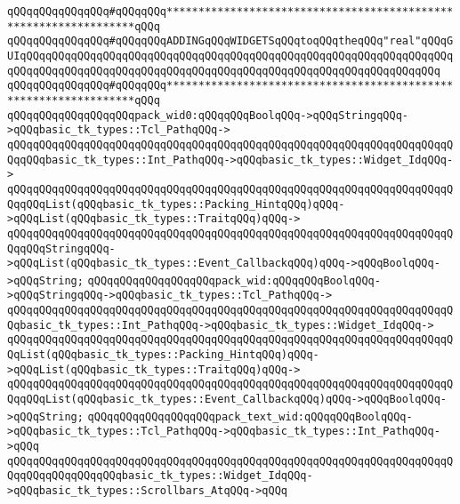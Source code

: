 \newline
\verb|qQQqqQQqqQQqqQQq#qQQqqQQq*****************************************************************qQQq|\newline
\verb|qQQqqQQqqQQqqQQq#qQQqqQQqADDINGqQQqWIDGETSqQQqtoqQQqtheqQQq"real"qQQqGUIqQQqqQQqqQQqqQQqqQQqqQQqqQQqqQQqqQQqqQQqqQQqqQQqqQQqqQQqqQQqqQQqqQQqqQQqqQQqqQQqqQQqqQQqqQQqqQQqqQQqqQQqqQQqqQQqqQQqqQQqqQQqqQQqqQQqqQQq|\newline
\verb|qQQqqQQqqQQqqQQq#qQQqqQQq*****************************************************************qQQq|\newline
\newline
\verb|qQQqqQQqqQQqqQQqqQQqpack_wid0:qQQqqQQqBoolqQQq->qQQqStringqQQq->qQQqbasic_tk_types::Tcl_PathqQQq->|\newline
\verb|qQQqqQQqqQQqqQQqqQQqqQQqqQQqqQQqqQQqqQQqqQQqqQQqqQQqqQQqqQQqqQQqqQQqqQQqqQQqbasic_tk_types::Int_PathqQQq->qQQqbasic_tk_types::Widget_IdqQQq->|\newline
\verb|qQQqqQQqqQQqqQQqqQQqqQQqqQQqqQQqqQQqqQQqqQQqqQQqqQQqqQQqqQQqqQQqqQQqqQQqqQQqList(qQQqbasic_tk_types::Packing_HintqQQq)qQQq->qQQqList(qQQqbasic_tk_types::TraitqQQq)qQQq->|\newline
\verb|qQQqqQQqqQQqqQQqqQQqqQQqqQQqqQQqqQQqqQQqqQQqqQQqqQQqqQQqqQQqqQQqqQQqqQQqqQQqStringqQQq->qQQqList(qQQqbasic_tk_types::Event_CallbackqQQq)qQQq->qQQqBoolqQQq->qQQqString;|\newline
\newline
\verb|qQQqqQQqqQQqqQQqqQQqpack_wid:qQQqqQQqBoolqQQq->qQQqStringqQQq->qQQqbasic_tk_types::Tcl_PathqQQq->|\newline
\verb|qQQqqQQqqQQqqQQqqQQqqQQqqQQqqQQqqQQqqQQqqQQqqQQqqQQqqQQqqQQqqQQqqQQqqQQqbasic_tk_types::Int_PathqQQq->qQQqbasic_tk_types::Widget_IdqQQq->|\newline
\verb|qQQqqQQqqQQqqQQqqQQqqQQqqQQqqQQqqQQqqQQqqQQqqQQqqQQqqQQqqQQqqQQqqQQqqQQqList(qQQqbasic_tk_types::Packing_HintqQQq)qQQq->qQQqList(qQQqbasic_tk_types::TraitqQQq)qQQq->|\newline
\verb|qQQqqQQqqQQqqQQqqQQqqQQqqQQqqQQqqQQqqQQqqQQqqQQqqQQqqQQqqQQqqQQqqQQqqQQqqQQqList(qQQqbasic_tk_types::Event_CallbackqQQq)qQQq->qQQqBoolqQQq->qQQqString;|\newline
\newline
\verb|qQQqqQQqqQQqqQQqqQQqpack_text_wid:qQQqqQQqBoolqQQq->qQQqbasic_tk_types::Tcl_PathqQQq->qQQqbasic_tk_types::Int_PathqQQq->qQQq|\newline
\verb|qQQqqQQqqQQqqQQqqQQqqQQqqQQqqQQqqQQqqQQqqQQqqQQqqQQqqQQqqQQqqQQqqQQqqQQqqQQqqQQqqQQqqQQqbasic_tk_types::Widget_IdqQQq->qQQqbasic_tk_types::Scrollbars_AtqQQq->qQQq|\newline
